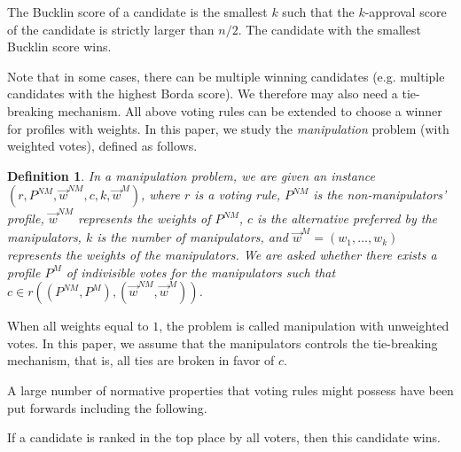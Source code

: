 \documentclass{ecai2012}
\newcommand\lirong[1]{}
\newtheorem{dfn}{Definition}
\begin{document}
 The Bucklin score of a candidate is the smallest $k$ such that the $k$-approval  score of the candidate is strictly larger than $n/2$. The candidate with the smallest Bucklin score wins.\lirong{Definition is changed.}


Note that in some cases, there can be
multiple winning candidates (e.g. multiple
candidates with the highest
Borda score). We therefore may
also need a tie-breaking mechanism.
All above voting rules can be extended to choose a winner for profiles with weights. In this paper, we study the {\em manipulation} problem (with weighted votes), defined as follows.
\begin{dfn}\lirong{I added a formal definition of the manipulation problem because some reviewer must ask for it...}
In a \emph{manipulation} problem, we are given an instance $(r,P^{NM},\vec
w^{NM},c,k,\vec w^M)$, where $r$ is a voting rule, $P^{NM}$ is the
non-manipulators' profile, $\vec w^{NM}$ represents the weights of
$P^{NM}$, $c$ is the alternative preferred by the manipulators, $k$
is the number of manipulators, and $\vec w^M=(w_1,\ldots,w_k)$
represents the weights of the manipulators. We are asked whether
there exists a profile $P^{M}$ of indivisible votes for the
manipulators such that $ c\in r((P^{NM},P^{M}), (\vec w^{NM},\vec
w^M))$.
\end{dfn}
When all weights equal to $1$, the problem is called manipulation with unweighted votes. In this paper, we assume that the manipulators controls the tie-breaking mechanism, that is, all ties are broken in favor of $c$.

A large number of normative properties
that voting rules might possess have been put forwards
including the following.

If a candidate is ranked in the top place by all voters,  then this candidate wins.
\end{document}
